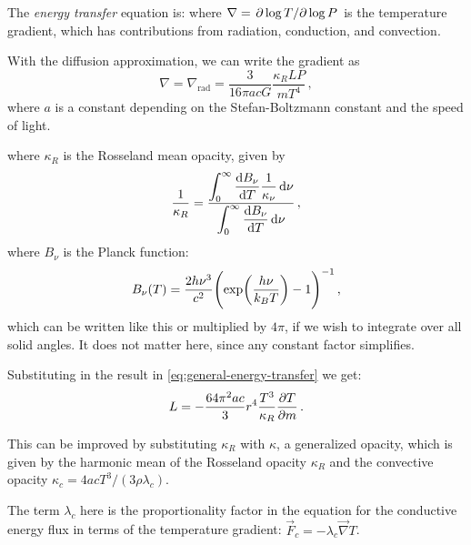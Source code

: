 \documentclass[main.tex]{subfiles}
\begin{document}
The \emph{energy transfer} equation is:
%
%
where \(\nabla = \pdv*{\log T}{\log P} \) is the temperature gradient, which has contributions from radiation, conduction, and convection.

With the diffusion approximation, we can write the gradient as
%
\begin{equation} \label{eq:diffusion-approx-gradient}
    \nabla = \nabla_{\text{rad}} = \frac{3}{16 \pi a c G} \frac{\kappa_R L P}{mT^4} \,,
\end{equation}
%
where \(a\) is a constant depending on the Stefan-Boltzmann constant and the speed of light.

%
where \(\kappa_R\) is the Rosseland mean opacity, given by
%
\begin{equation}
  \frac{1}{\kappa_{R}} =
  \frac{ \displaystyle\int _{0}   ^{\infty}  \dv{B_\nu}{T} \frac{1}{\kappa_\nu} \dd{\nu}}
  {  \displaystyle \int _{0}   ^{\infty} \dv{B_\nu}{T} \dd{\nu}}\,,
\end{equation}
%
where \(B_{\nu }\) is the Planck function: 
%
\begin{align}
B_{\nu } (T) = \frac{2 h \nu^3}{ c^2} \qty(\exp(\frac{h \nu }{k_B T}) - 1)^{-1}
\,,
\end{align}
%
which can be written like this or multiplied by \(4 \pi  \), if we wish to integrate over all solid angles. It does not matter here, since any constant factor simplifies. 

Substituting in the result in \eqref{eq:general-energy-transfer} we get:
%
\begin{equation}
    L = - \frac{64 \pi^2 a c }{3} r^4 \frac{T^3}{\kappa_R} \pdv{T}{m}
\,.
\end{equation}

This can be improved by substituting \(\kappa_{R}   \) with \(\kappa\), a generalized opacity, which is given by the harmonic mean of the Rosseland opacity \(\kappa _R \) and the convective opacity \(\kappa_c = 4acT^3 / (3 \rho \lambda_c )\).

The term \(\lambda_{c}\) here is the proportionality factor in the equation for the conductive energy flux in terms of the temperature gradient: \(\vec{F}_{c} = - \lambda_{c} \vec{\nabla} T\). 
\end{document}
